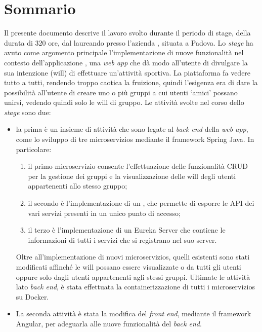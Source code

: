 
\cleardoublepage
{}
{}
\begingroup
\let\clearpage\relax
\let\cleardoublepage\relax
\let\cleardoublepage\relax

\chapter*{Sommario}

Il presente documento descrive il lavoro svolto durante il periodo di stage, della durata di 320 ore, dal laureando \myName\xspace presso
 l'azienda \myCompany, situata a Padova.
Lo \textit{stage} ha avuto come argomento principale l'implementazione di nuove funzionalità nel contesto dell'applicazione \productName, una
\textit{web app} che dà modo all'utente di divulgare la sua intenzione (\gls{will}) di effettuare un'attività sportiva.
La piattaforma fa vedere tutto a tutti, rendendo troppo caotica la fruizione, quindi l'esigenza era di dare la possibilità all'utente 
di creare uno o più gruppi a cui utenti \enquote*{amici} possano unirsi, vedendo quindi solo le \gls{will} di gruppo.
Le attività svolte nel corso dello \textit{stage} sono due:
\begin{itemize}
    \item la prima è un insieme di attività che sono legate al \textit{back end} della \textit{web app}, come lo sviluppo di tre \glspl{microservizio} mediante il \gls{framework} Spring Java. 
    In particolare: 
        \begin{enumerate}
            \item il primo \gls{microservizio} consente l'effettuazione delle funzionalità \gls{CRUD} per la gestione dei gruppi e la visualizzazione delle \gls{will} 
            degli utenti appartenenti allo stesso gruppo;
            \item il secondo è l'implementazione di un , che permette di esporre le \gls{API} dei vari servizi presenti in un 
            unico punto di accesso;
            \item il terzo è l'implementazione di un \gls{Eureka Server} che contiene le informazioni di tutti i servizi che si registrano nel suo server.
        \end{enumerate}
    Oltre all'implementazione di nuovi \glspl{microservizio}, quelli esistenti sono stati modificati affinché le \gls{will} possano
    essere visualizzate o da tutti gli utenti oppure solo dagli utenti appartenenti agli stessi gruppi. 
    Ultimate le attività lato \textit{back end}, è stata effettuata la \gls{containerizzazione} di tutti i \glspl{microservizio} su Docker.
    \item La seconda attività è stata la modifica del \textit{front end}, mediante il \gls{framework} Angular, per adeguarla alle nuove funzionalità del \textit{back end}.
\end{itemize}
